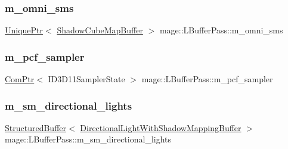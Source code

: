 \hypertarget{structmage_1_1_l_buffer_pass_a083245bbfa560e2e16fd829a30ad857d}{}\label{structmage_1_1_l_buffer_pass_a083245bbfa560e2e16fd829a30ad857d} 
\subsubsection{\texorpdfstring{m\+\_\+omni\+\_\+sms}{m\_omni\_sms}}
{\footnotesize\ttfamily \hyperlink{namespacemage_a3316d7143a973e37adf1110f2e80ca31}{Unique\+Ptr}$<$ \hyperlink{structmage_1_1_shadow_cube_map_buffer}{Shadow\+Cube\+Map\+Buffer} $>$ mage\+::\+L\+Buffer\+Pass\+::m\+\_\+omni\+\_\+sms\hspace{0.3cm}{\ttfamily [private]}}

\hypertarget{structmage_1_1_l_buffer_pass_aaf8dacd30171f31fe2a898fbdd91a990}{}\label{structmage_1_1_l_buffer_pass_aaf8dacd30171f31fe2a898fbdd91a990} 
\subsubsection{\texorpdfstring{m\+\_\+pcf\+\_\+sampler}{m\_pcf\_sampler}}
{\footnotesize\ttfamily \hyperlink{namespacemage_ae74f374780900893caa5555d1031fd79}{Com\+Ptr}$<$ I\+D3\+D11\+Sampler\+State $>$ mage\+::\+L\+Buffer\+Pass\+::m\+\_\+pcf\+\_\+sampler\hspace{0.3cm}{\ttfamily [private]}}

\hypertarget{structmage_1_1_l_buffer_pass_ad9a714aed008db64b5a7d9be1a5f741c}{}\label{structmage_1_1_l_buffer_pass_ad9a714aed008db64b5a7d9be1a5f741c} 
\subsubsection{\texorpdfstring{m\+\_\+sm\+\_\+directional\+\_\+lights}{m\_sm\_directional\_lights}}
{\footnotesize\ttfamily \hyperlink{classmage_1_1_structured_buffer}{Structured\+Buffer}$<$ \hyperlink{structmage_1_1_directional_light_with_shadow_mapping_buffer}{Directional\+Light\+With\+Shadow\+Mapping\+Buffer} $>$ mage\+::\+L\+Buffer\+Pass\+::m\+\_\+sm\+\_\+directional\+\_\+lights\hspace{0.3cm}{\ttfamily [private]}}

